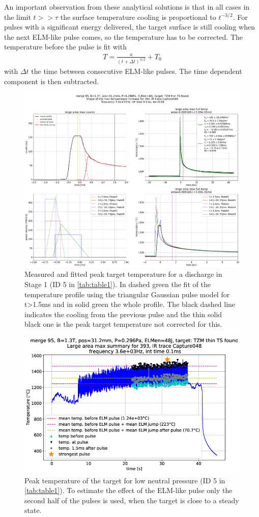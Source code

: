 An important observation from these analytical solutions is that in all cases in the limit $t>>\tau$ the surface temperature cooling is proportional to $t^{-3/2}$. For pulses with a significant energy delivered, the target surface is still cooling when the next ELM-like pulse comes, so the temperature has to be corrected. The temperature before the pulse is fit with
\begin{equation}
\label{eq:squareSS}
\begin{aligned}
T=\frac{a}{ (t+ \Delta t)^{3/2}} + T_{0}
\end{aligned}
\end{equation}
with $\Delta t$ the time between consecutive ELM-like pulses. The time dependent component is then subtracted.


\begin{figure}[!ht]
	\centering
	\includegraphics[width=0.7\linewidth,trim={750 550 10 115},clip]{Chapters/chapter3/figs/file_index_394_IR_trace_Capture049_43_old.png}
	\caption{Measured and fitted peak target temperature for a discharge in Stage 1 (ID 5 in \autoref{tab:table1}). In dashed green the fit of the temperature profile using the triangular Gaussian pulse model for t>1.5ms and in solid green the whole profile. The black dashed line indicates the cooling from the previous pulse and the thin solid black one is the peak target temperature not corrected for this.}
	\label{fig:IR4}
\end{figure}

\begin{figure}[!ht]
	\centering
	\includegraphics[width=0.7\linewidth,trim={5 5 55 65},clip]{Chapters/chapter3/figs/file_index_393_IR_trace_Capture048_46.png}
	\caption{Peak temperature of the target for low neutral pressure (ID 5 in \autoref{tab:table1}). To estimate the effect of the ELM-like pulse only the second half of the pulses is used, when the target is close to a steady state.}
	\label{fig:IR5}
\end{figure}

